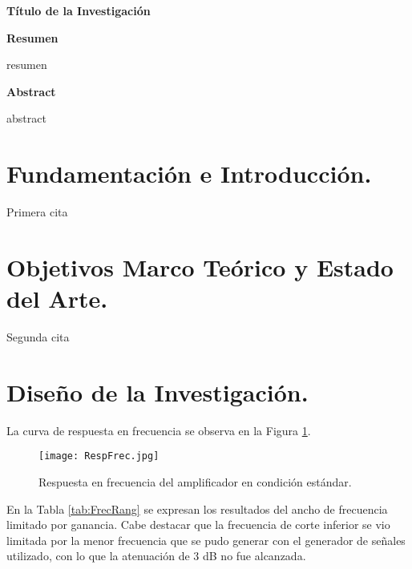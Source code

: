 

\begin{center}
	\fontsize{14pt}{17pt}\selectfont
	\textbf{Título de la Investigación}
\end{center}
\begin{flushleft} 
	\fontsize{14pt}{17pt}\selectfont
	\textbf{Resumen}
\end{flushleft}

resumen

\begin{flushleft} 
	\fontsize{14pt}{17pt}\selectfont
	\textbf{Abstract}
\end{flushleft}

abstract

\section{Fundamentación e Introducción.}
Primera cita \cite{leimeister}

\section{Objetivos Marco Teórico y Estado del Arte.}
Segunda cita \cite{foote1999}


\section{Diseño de la Investigación.}
La curva de respuesta en frecuencia se observa en la Figura \ref{fig:RespFrec}.

\begin{figure}[h]
	\centering
	\texttt{[image: RespFrec.jpg]}
	\caption[RespFrec]{Respuesta en frecuencia del amplificador en condición estándar.} 
	\label{fig:RespFrec}
\end{figure}

En la Tabla \ref{tab:FrecRang} se expresan los resultados del ancho de frecuencia limitado por ganancia. Cabe destacar que la frecuencia de corte inferior se vio limitada por la menor frecuencia que se pudo generar con el generador de señales utilizado, con lo que la atenuación de 3 dB no fue alcanzada.


